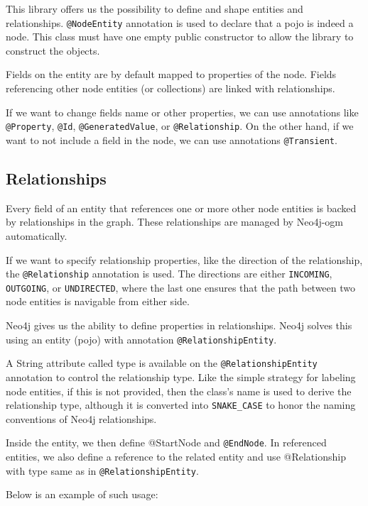This library offers us the possibility to define and shape entities and relationships. \texttt{@NodeEntity} annotation is used to declare that a \acrfull{pojo}
is indeed a node. This class must have one empty public constructor to allow the library to construct the objects.

Fields on the entity are by default mapped to properties of the node. Fields referencing other node entities (or collections) are linked with relationships.

If we want to change fields name or other properties, we can use annotations like \texttt{@Property}, \texttt{@Id}, \texttt{@GeneratedValue}, or \texttt{@Relationship}. On the other hand,
if we want to not include a field in the node, we can use annotations \texttt{@Transient}.

\subsection {Relationships}

Every field of an entity that references one or more other node entities is backed by relationships in the graph. These relationships are managed by Neo4j-\acrshort{ogm} automatically.

If we want to specify relationship properties, like the direction of the relationship, the \texttt{@Relationship} annotation is used. The directions are either \texttt{INCOMING},
\texttt{OUTGOING}, or \texttt{UNDIRECTED}, where the last one ensures that the path between two node entities is navigable from either side.

Neo4j gives us the ability to define properties in relationships. Neo4j solves this using an entity (\acrshort{pojo}) with annotation \texttt{@RelationshipEntity}.

A String attribute called type is available on the \texttt{@RelationshipEntity} annotation to control the relationship type. Like the simple strategy for labeling node entities,
if this is not provided, then the class's name is used to derive the relationship type, although it is converted into \texttt{SNAKE\_CASE} to honor
the naming conventions of Neo4j relationships. \cite{noauthor_reference_nodate}

Inside the entity, we then define @StartNode and \texttt{@EndNode}. In referenced entities, we also define a reference to
the related entity and use @Relationship with type same as in \texttt{@RelationshipEntity}.

Below is an example of such usage:

